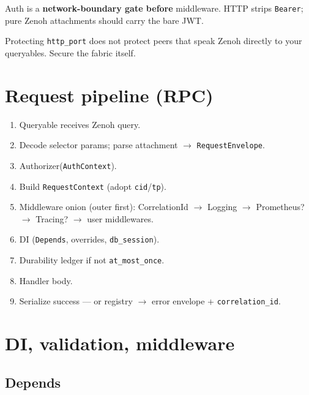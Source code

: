 \documentclass[11pt,a4paper]{article}
\begin{document}
Auth is a \textbf{network-boundary gate before} middleware. HTTP strips
\texttt{Bearer}; pure Zenoh attachments should carry the bare JWT.

\begin{warnbox}
Protecting \texttt{http\_port} does not protect peers that speak Zenoh directly
to your queryables. Secure the fabric itself.
\end{warnbox}

\section{Request pipeline (RPC)}

\begin{enumerate}[leftmargin=*,itemsep=2pt]
  \item Queryable receives Zenoh query.
  \item Decode selector params; parse attachment $\to$ \texttt{RequestEnvelope}.
  \item Authorizer(\texttt{AuthContext}).
  \item Build \texttt{RequestContext} (adopt \texttt{cid}/\texttt{tp}).
  \item Middleware onion (outer first): CorrelationId $\to$ Logging $\to$
        Prometheus? $\to$ Tracing? $\to$ user middlewares.
  \item DI (\texttt{Depends}, overrides, \texttt{db\_session}).
  \item Durability ledger if not \texttt{at\_most\_once}.
  \item Handler body.
  \item Serialize success --- or registry $\to$ error envelope +
        \texttt{correlation\_id}.
\end{enumerate}

\section{DI, validation, middleware}

\subsection{Depends}
\end{document}
